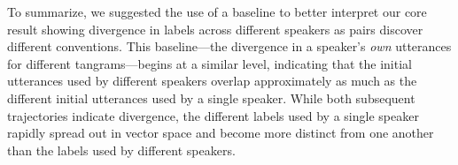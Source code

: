 \documentclass[alpha-refs]{wiley-article}
\begin{document}
To summarize, we suggested the use of a baseline to better interpret our core result showing divergence in labels across different speakers as pairs discover different conventions.
This baseline---the divergence in a speaker's \emph{own} utterances for different tangrams---begins at a similar level, indicating that the initial utterances used by different speakers overlap approximately as much as the different initial utterances used by a single speaker.
While both subsequent trajectories indicate divergence, the different labels used by a single speaker rapidly spread out in vector space and become more distinct from one another than the labels used by different speakers.


\end{document}
